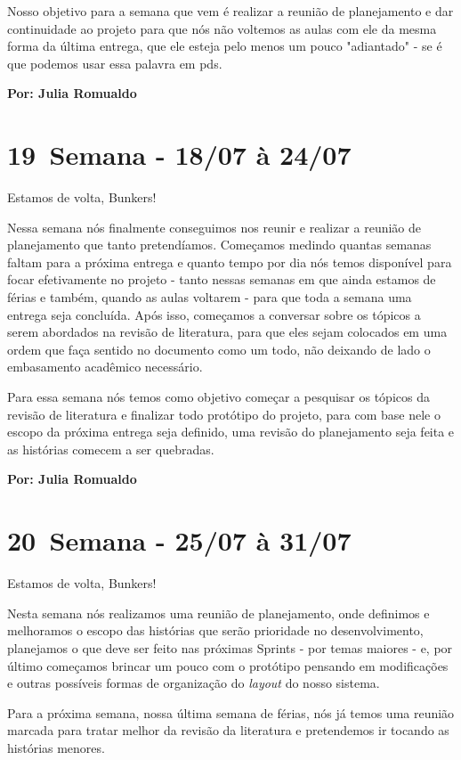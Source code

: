 Nosso objetivo para a semana que vem é realizar a reunião de planejamento e dar continuidade ao projeto para que nós não voltemos as aulas com ele da mesma forma da última entrega, que ele esteja pelo menos um pouco "adiantado" - se é que podemos usar essa palavra em \acs{pds}.

\textbf{Por: Julia Romualdo}

\section{19\textordfeminine \, Semana - 18/07 à 24/07}
Estamos de volta, Bunkers!

Nessa semana nós finalmente conseguimos nos reunir e realizar a reunião de planejamento que tanto pretendíamos. Começamos medindo quantas semanas faltam para a próxima entrega e quanto tempo por dia nós temos disponível para focar efetivamente no projeto - tanto nessas semanas em que ainda estamos de férias e também, quando as aulas voltarem - para que toda a semana uma entrega seja concluída. Após isso, começamos a conversar sobre os tópicos a serem abordados na revisão de literatura, para que eles sejam colocados em uma ordem que faça sentido no documento como um todo, não deixando de lado o embasamento acadêmico necessário. 

Para essa semana nós temos como objetivo começar a pesquisar os tópicos da revisão de literatura e finalizar todo protótipo do projeto, para com base nele o escopo da próxima entrega seja definido, uma revisão do planejamento seja feita e as histórias comecem a ser quebradas.

\textbf{Por: Julia Romualdo}

\section{20\textordfeminine \, Semana - 25/07 à 31/07}
Estamos de volta, Bunkers!

Nesta semana nós realizamos uma reunião de planejamento, onde definimos e melhoramos o escopo das histórias que serão prioridade no desenvolvimento, planejamos o que deve ser feito nas próximas \glspl{Sprint} - por temas maiores - e, por último começamos brincar um pouco com o protótipo pensando em modificações e outras possíveis formas de organização do \textit{layout} do nosso sistema.

Para a próxima semana, nossa última semana de férias, nós já temos uma reunião marcada para tratar melhor da revisão da literatura e pretendemos ir tocando as histórias menores.

